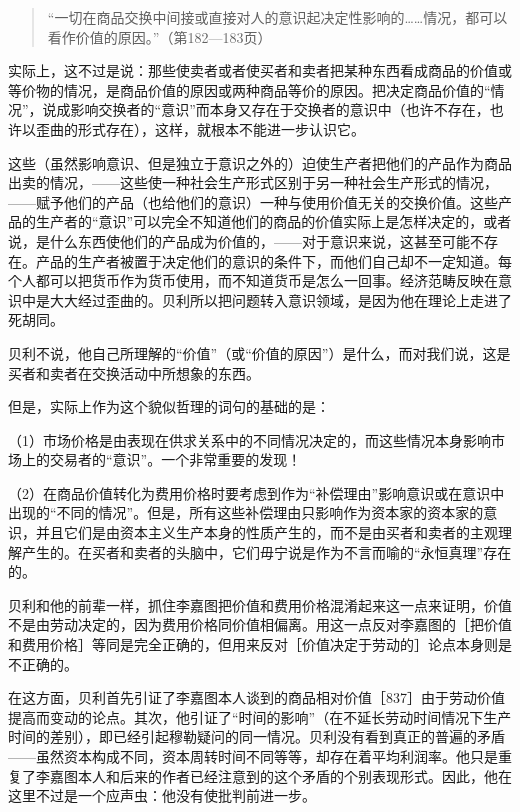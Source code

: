 \begin{quote}{“一切在商品交换中间接或直接对人的意识起决定性影响的……情况，都可以看作价值的原因。”（第182—183页）}\end{quote}

实际上，这不过是说：那些使卖者或者使买者和卖者把某种东西看成商品的价值或等价物的情况，是商品价值的原因或两种商品等价的原因。把决定商品价值的“情况”，说成影响交换者的“意识”而本身又存在于交换者的意识中（也许不存在，也许以歪曲的形式存在），这样，就根本不能进一步认识它。

这些（虽然影响意识、但是独立于意识之外的）迫使生产者把他们的产品作为商品出卖的情况，——这些使一种社会生产形式区别于另一种社会生产形式的情况，——赋予他们的产品（也给他们的意识）一种与使用价值无关的交换价值。这些产品的生产者的“意识”可以完全不知道他们的商品的价值实际上是怎样决定的，或者说，是什么东西使他们的产品成为价值的，——对于意识来说，这甚至可能不存在。产品的生产者被置于决定他们的意识的条件下，而他们自己却不一定知道。每个人都可以把货币作为货币使用，而不知道货币是怎么一回事。经济范畴反映在意识中是大大经过歪曲的。贝利所以把问题转入意识领域，是因为他在理论上走进了死胡同。

贝利不说，他自己所理解的“价值”（或“价值的原因”）是什么，而对我们说，这是买者和卖者在交换活动中所想象的东西。

但是，实际上作为这个貌似哲理的词句的基础的是：

（1）市场价格是由表现在供求关系中的不同情况决定的，而这些情况本身影响市场上的交易者的“意识”。一个非常重要的发现！

（2）在商品价值转化为费用价格时要考虑到作为“补偿理由”影响意识或在意识中出现的“不同的情况”。但是，所有这些补偿理由只影响作为资本家的资本家的意识，并且它们是由资本主义生产本身的性质产生的，而不是由买者和卖者的主观理解产生的。在买者和卖者的头脑中，它们毋宁说是作为不言而喻的“永恒真理”存在的。

贝利和他的前辈一样，抓住李嘉图把价值和费用价格混淆起来这一点来证明，价值不是由劳动决定的，因为费用价格同价值相偏离。用这一点反对李嘉图的［把价值和费用价格］等同是完全正确的，但用来反对［价值决定于劳动的］论点本身则是不正确的。

在这方面，贝利首先引证了李嘉图本人谈到的商品相对价值［837］由于劳动价值提高而变动的论点。其次，他引证了“时间的影响”（在不延长劳动时间情况下生产时间的差别），即已经引起穆勒疑问的同一情况。贝利没有看到真正的普遍的矛盾——虽然资本构成不同，资本周转时间不同等等，却存在着平均利润率。他只是重复了李嘉图本人和后来的作者已经注意到的这个矛盾的个别表现形式。因此，他在这里不过是一个应声虫：他没有使批判前进一步。

